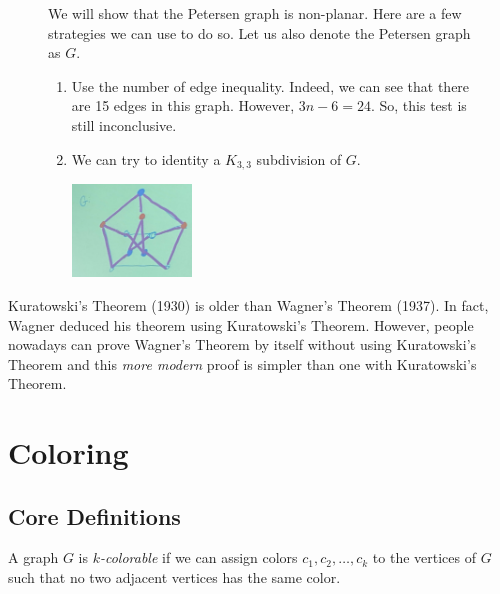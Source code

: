 \begin{figure}[ht]
\begin{nexample}
  We will show that the Petersen graph is non-planar. Here are a
  few strategies we can use to do so. Let us also denote the
  Petersen graph as \(G\).
  \begin{enumerate}
    \item Use the number of edge inequality. Indeed, we can see
      that there are 15 edges in this graph. However, \(3n-6 =
      24\). So, this test is still inconclusive.

    \item We can try to identity a \(K_{3, 3}\) subdivision of
      \(G\). 
      \begin{center}
        \includegraphics[width=0.3\textwidth]{figures/l14/petersen-k33}
      \end{center}
  \end{enumerate}
\end{nexample}
\end{figure}

\begin{distraction}
  Kuratowski's Theorem (1930) is older than Wagner's Theorem
  (1937). In fact, Wagner deduced his theorem using Kuratowski's
  Theorem. However, people nowadays can prove Wagner's Theorem by
  itself without using Kuratowski's Theorem and this \textit{more
  modern} proof is simpler than one with Kuratowski's Theorem.
\end{distraction}

\chapter{Coloring}

\section{Core Definitions}

\begin{definition}[\(k\)-colorable]
  A graph \(G\) is \textit{\(k\)-colorable} if we can assign 
  colors \(c_1, c_2, \ldots, c_k\) to the vertices of \(G\) such
  that no two adjacent vertices has the same color.
\end{definition}

